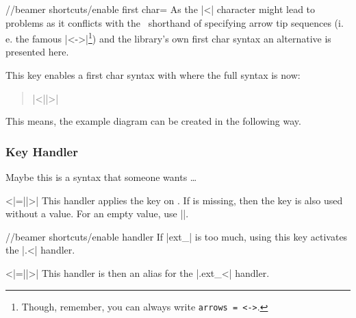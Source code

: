 \begin{key}{/\tikzext/beamer shortcuts/enable first char=}
  As the |<| character might lead to problems as it conflicts with the \tikzname\ shorthand
  of specifying arrow tip sequences
  (i.\,e. the famous |<->|\footnote{Though, remember, you can always write \texttt{arrows = <->}.})
  and the  library's own first char syntax
  an alternative is presented here.
  
  This key enables a first char syntax with  where the full syntax is now:
  \begin{quote}
      |<||>|
  \end{quote}
  
  This means, the example diagram can be created in the following way.
\begin{codeexample}[preamble=\usetikzlibrary{ext.beamer} \setbeamercovered{transparent},code only]
\end{codeexample}
\end{key}

\subsubsection{Key Handler}
Maybe this is a syntax that someone wants \dots
\begin{ext_handler}{{<}|=||>|}
  This handler applies the key on .
  If  is missing, then the key is also used without a value.
  For an empty value, use |{}|.
  \begin{key}{/\tikzext/beamer shortcuts/enable handler}
    If |ext_| is too much, using this key activates the |.<| handler.
    \begin{handler}{{<}|=||>|}
      This handler is then an alias for the |.ext_<| handler.
    \end{handler}
  \end{key}
\end{ext_handler}
\endinput